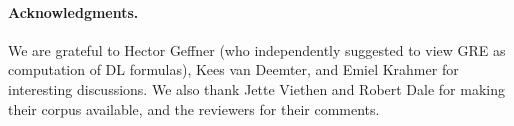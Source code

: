 \begin{small}
\paragraph{Acknowledgments.} We are grateful to Hector Geffner (who
independently suggested to view GRE as computation of DL formulas),
Kees van Deemter, and Emiel Krahmer for interesting discussions.  We
also thank Jette Viethen and Robert Dale for making their corpus
available, and the reviewers for their comments.
\end{small}



